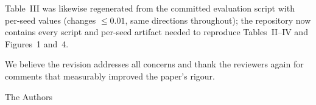 \documentclass[11pt]{article}
\begin{document}
Table~III was likewise regenerated from the committed evaluation script with
per-seed values (changes $\le0.01$, same directions throughout); the
repository now contains every script and per-seed artifact needed to reproduce
Tables~II--IV and Figures~1 and~4.

We believe the revision addresses all concerns and thank the reviewers again
for comments that measurably improved the paper's rigour.

\bigskip
\noindent The Authors
\end{document}
